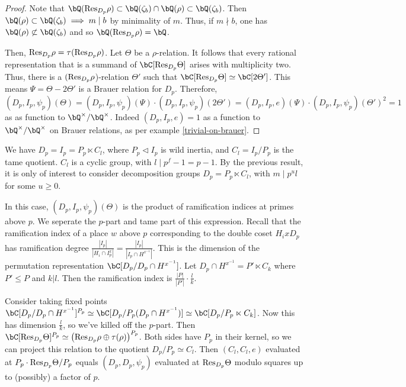 \begin{proof}
    Note that $\bQ(\Res_{D_p}{\rho}) \subset \bQ(\zeta_b) \cap \bQ(\rho) \subset \bQ(\zeta_b)$. Then $\bQ(\rho) \subset \bQ(\zeta_b) \implies m \mid b$ by minimality of $m$. Thus, if $m \nmid b$, one has $\bQ(\rho) \not\subset \bQ(\zeta_b)$ and so $\bQ(\Res_{D_p} \rho) = \bQ$. 

    Then, $\mathrm{Res}_{D_p} \rho = \tau (\mathrm{Res}_{D_p} \rho)$. Let $\Theta$ be a $\rho$-relation. It follows that every rational representation that is a summand of $\bC[\Res_{D_p} \Theta]$ arises with multiplicity two. 
    Thus, there is a $(\mathrm{Res}_{D_p}\rho$)-relation $\Theta ' $ such that $\bC[\Res_{D_p} \Theta] \simeq \bC[2 \Theta']$. This means $\Psi = \Theta - 2 \Theta'$ is a Brauer relation for $D_p$. Therefore, $(D_p, I_p, \psi_p)(\Theta) = (D_p, I_p, \psi_p)(\Psi) \cdot (D_p, I_p, \psi_p)(2 \Theta') = (D_p, I_p, e)(\Psi)  \cdot (D_p, I_p, \psi_p)(\Theta')^2 = 1$ as as function to $\bQ^{\times} / \bQ^{\times}$. Indeed $(D_p, I_p, e) = 1$ as a function to $\bQ^{\times} / \bQ^{\times}$ on Brauer relations, as per example \ref{trivial-on-brauer}.
\end{proof}

We have $D_p = I_p = P_p \ltimes C_l$, where $P_p \triangleleft I_p$ is wild inertia, and $C_l = I_p / P_p$ is the tame quotient. $C_l$ is a cyclic group, with $l \mid p^f - 1 = p - 1$. By the previous result, it is only of interest to consider decomposition groups $D_p = P_p \ltimes C_l$, with $m \mid p^u l$ for some $u \geq 0$. 

In this case, $(D_p, I_p, \psi_p)(\Theta)$ is the product of ramification indices at primes above $p$. We seperate the $p$-part and tame part of this expression.
Recall that the ramification index of a place $w$ above $p$ corresponding to the double coset $H_i x D_p$ has ramification degree $\frac{|I_p|}{|H_i \cap I_p^x|} =\frac{|I_p|}{|I_p \cap H^{x^{-1}}|}$.
This is the dimension of the permutation representation $\bC[D_p / D_p \cap H^{x^{-1}}]$.
Let  $D_p \cap H^{x^{-1}} = P' \ltimes C_k$ where $P' \leq P$ and $k | l$. Then the ramification index is $\frac{|P|}{|P'|}\cdot \frac{l}{k}$. 


Consider taking fixed points $\bC[D_p / D_p \cap H^{x^{-1}}]^{P_p} \simeq \bC[D_p / P_p (D_p \cap H^{x^{-1}})] \simeq \bC[D_p / P_p \ltimes C_k]$. Now this has dimension $\frac{l}{k}$, so we've killed off the $p$-part. 
Then $\bC[\Res_{D_p} \Theta]^{P_p} \simeq \left(\Res_{D_p} \rho \oplus \tau(\rho)\right)^{P_p}$. Both sides have $P_p$ in their kernel, so we can project this relation to the quotient $D_p / P_p \simeq C_l$. Then
$(C_l, C_l, e)$ evaluated at $P_p \cdot \mathrm{Res}_{D_p}\Theta / P_p$ equals $(D_p, D_p, \psi_p)$ evaluated at $\mathrm{Res}_{D_p} \Theta$ modulo squares up to (possibly) a factor of $p$.

